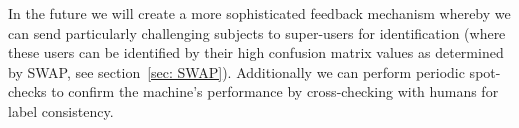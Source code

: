 \documentclass[twocolumn]{aastex6}
\begin{document}
In the future we will create a more sophisticated feedback mechanism whereby we 
can send particularly challenging subjects to super-users for identification (where 
these users can be identified by their high confusion matrix values as determined by SWAP,
 see section~\ref{sec: SWAP}). Additionally we can perform periodic spot-checks 
to confirm the machine's performance by cross-checking with humans for label consistency. 

\end{document}
